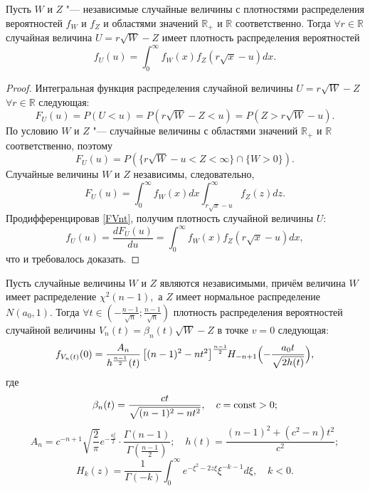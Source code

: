 \smallskip

\begin{lemma}[1]Пусть $W$ и $Z$ "--- независимые случайные величины с плотностями распределения
вероятностей $f_W$ и $f_Z$ и областями значений $\mathbb{R}_{+}$ и $\mathbb{R}$ соответственно.
Тогда  $\forall r\in \mathbb{R}$ случайная величина
$U=r\sqrt{W}-Z$
имеет плотность распределения
вероятностей
\begin{equation}\label{fV}
f_{U}(u)=\int_0^{\infty}f_{W}(x)f_{Z}(r\sqrt{x}-u)dx.
\end{equation}
\end{lemma}

\begin{proof}%
Интегральная функция распределения случайной величины $U=r\sqrt{W}-Z$ 
 $\forall r\in \mathbb{R}$  следующая:
$$F_{U}(u)=P(U < u)=P(r\sqrt{W}-Z<u)=P(Z>r\sqrt{W}-u).$$
По условию $W$ и $Z$  "--- случайные величины с областями значений $\mathbb{R}_{+}$ и $\mathbb{R}$ соответственно, поэтому
$$F_{U}(u)=P(\{r\sqrt{W}-u<Z<\infty\}\cap\{W>0\}).$$
Случайные величины $W$ и $Z$ независимы, следовательно,
\begin{equation}\label{FVnt}
F_{U}(u)=\int_0^{\infty}f_{W}(x)dx
\int_{r\sqrt{x}-u}^{\infty}f_{Z}(z)dz.
\end{equation}
Продифференцировав \eqref{FVnt}, получим плотность случайной величины $U$:
\[
f_{U}(u)=\frac{dF_{U}(u)}{du}=\int_0^{\infty}f_{W}(x)f_{Z}(r\sqrt{x}-u)dx,
\]
что и требовалось доказать.\end{proof}

\smallskip

\begin{lemma}[2]
Пусть случайные величины $W$ и $Z$
являются независимыми, причём
величина $W$ имеет  распределение $\chi^2(n-1),$ а
 $Z$ имеет нормальное   распределение $N(a_0, 1).$
Тогда
$\forall t\in\left(-\frac{n-1}{\sqrt{n}};\frac{n-1}{\sqrt{n}}\right)$
плотность распределения
вероятностей случайной величины
$V_n(t)=\beta_n(t)\sqrt{W}-Z$
в точке $v=0$  следующая:
\begin{equation}\label{fV0}
f_{V_n(t)}(0)=\frac{A_n}{h^{\frac{n-1}{2}}(t)}
\left[(n-1)^2-nt^2\right]^{\frac{n-1}{2}}\hspace{-1mm}H_{-n+1}\Bigl(-\frac{a_0 t}{\sqrt{2h(t)}}\Bigr),
\end{equation}
где $$\beta_n(t)=\frac{ct}{\sqrt{(n-1)^2-nt^2}},\quad  c={\rm const}>0;$$
$$ A_n=c^{-n+1}\sqrt{\frac{2}{\pi}}e^{-\frac{a_0^2}{2}}\cdot\frac{\Gamma(n-1)}{\Gamma(\frac{n-1}{2})}; \quad h(t)= \frac{(n-1)^2+(c^2-n)t^2}{c^2};$$ 
$$H_{k}(z)=\frac{1}{\Gamma(-k)}\int_0^{\infty}e^{-\xi^2-2z\xi}\xi^{-k-1}d\xi, \quad k<0.$$ 
\end{lemma}

